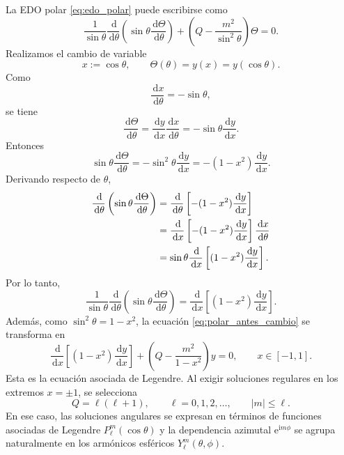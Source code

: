 \documentclass[11pt]{article}
\newcommand{\dd}{\,\mathrm{d}}
\newcommand{\ii}{\mathrm{i}}
\newcommand{\e}{\mathrm{e}}
\begin{document}
La EDO polar \eqref{eq:edo_polar} puede escribirse como
\begin{equation}
\frac{1}{\sin\theta}\frac{\dd}{\dd\theta}
    \left(\sin\theta\frac{\dd\Theta}{\dd\theta}\right)
    +
    \left(Q-\frac{m^2}{\sin^2\theta}\right)\Theta=0.
    \label{eq:polar_antes_cambio}
\end{equation}
Realizamos el cambio de variable
\begin{equation*}
x:=\cos\theta,
    \qquad
    \Theta(\theta)=y(x)=y(\cos\theta).
\end{equation*}
Como
\begin{equation*}
\frac{\dd x}{\dd\theta}=-\sin\theta,
\end{equation*}
se tiene
\begin{equation*}
\frac{\dd\Theta}{\dd\theta}
    =
    \frac{\dd y}{\dd x}\frac{\dd x}{\dd\theta}
    =
    -\sin\theta\frac{\dd y}{\dd x}.
\end{equation*}
Entonces
\begin{equation*}
\sin\theta\frac{\dd\Theta}{\dd\theta}
    =
    -\sin^2\theta\frac{\dd y}{\dd x}
    =
    -(1-x^2)\frac{\dd y}{\dd x}.
\end{equation*}
Derivando respecto de $\theta$,
\begin{align*}
\frac{\dd}{\dd\theta}
    \left(\sin\theta\frac{\dd\Theta}{\dd\theta}\right)
    &=
    \frac{\dd}{\dd\theta}
    \left[-(1-x^2)\frac{\dd y}{\dd x}\right]
    \notag\\
    &=
    \frac{\dd}{\dd x}
    \left[-(1-x^2)\frac{\dd y}{\dd x}\right]
    \frac{\dd x}{\dd\theta}
    \notag\\
    &=
    \sin\theta\frac{\dd}{\dd x}
    \left[(1-x^2)\frac{\dd y}{\dd x}\right].
\end{align*}
Por lo tanto,
\begin{equation*}
\frac{1}{\sin\theta}\frac{\dd}{\dd\theta}
    \left(\sin\theta\frac{\dd\Theta}{\dd\theta}\right)
    =
    \frac{\dd}{\dd x}
    \left[(1-x^2)\frac{\dd y}{\dd x}\right].
\end{equation*}
Además, como $\sin^2\theta=1-x^2$, la ecuación \eqref{eq:polar_antes_cambio} se transforma en
\begin{equation*}
\frac{\dd}{\dd x}
    \left[(1-x^2)\frac{\dd y}{\dd x}\right]
    +
    \left(Q-\frac{m^2}{1-x^2}\right)y=0,
    \qquad x\in[-1,1].
\end{equation*}
Esta es la ecuación asociada de Legendre. Al exigir soluciones regulares en los extremos $x=\pm1$, se selecciona
\begin{equation*}
Q=\ell(\ell+1),
    \qquad
    \ell=0,1,2,\ldots,
    \qquad
    |m|\leq \ell.
\end{equation*}
En ese caso, las soluciones angulares se expresan en términos de funciones asociadas de Legendre $P_\ell^m(\cos\theta)$ y la dependencia azimutal $\e^{\ii m\phi}$ se agrupa naturalmente en los armónicos esféricos $Y_\ell^m(\theta,\phi)$.
\end{document}
